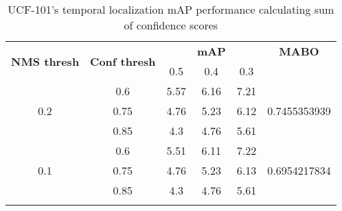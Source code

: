 \begin{center}

  \setlength{\tabcolsep}{2pt}
  \begin{longtable}{|| c | c || c c c | c ||}

    \hline
    \multirow{2}{*}{\textbf{NMS thresh}} & \multirow{2}{*}{\textbf{Conf thresh}} & {} & \textbf{mAP} & {} & \textbf{MABO} \\
    {} & {} & 0.5 & 0.4 & 0.3 & {}\\
    \hline
    \multirow{3}{*}{0.2} & 0.6 & 5.57 & 6.16 & 7.21 & \multirow{3}{*}{0.7455353939}\\
    \cline{2-5}
    {} & 0.75 & 4.76 & 5.23 & 6.12 & {}\\
    \cline{2-5}
    {} & 0.85 & 4.3 & 4.76 & 5.61 & {}\\
    \hline
    \multirow{3}{*}{0.1} & 0.6 & 5.51 & 6.11 & 7.22 & \multirow{3}{*}{0.6954217834} \\
    \cline{2-5}
    {} & 0.75 & 4.76 & 5.23 & 6.13 & {}\\
    \cline{2-5}
    {} & 0.85 & 4.3 & 4.76 & 5.61 & {}\\
    \hline

    \caption{UCF-101's temporal localization mAP performance calculating sum of confidence scores}
    \label{table:temp_cls_3}
  \end{longtable}
\end{center}
